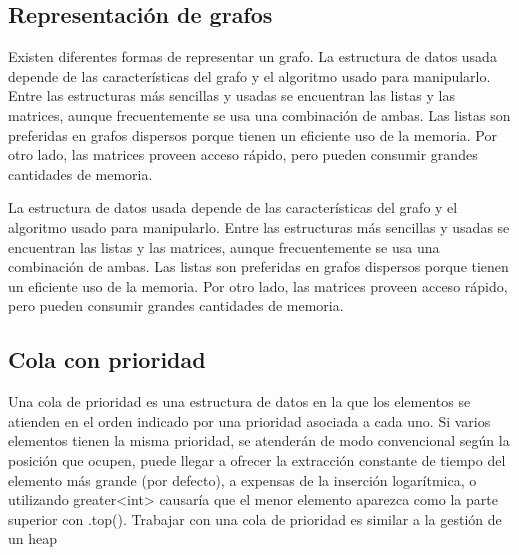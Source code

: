 \subsection{Representación de grafos}
Existen diferentes formas de representar un grafo. La estructura de datos usada depende de las características del grafo y el algoritmo usado para manipularlo. Entre las estructuras más sencillas y usadas se encuentran las listas y las matrices, aunque frecuentemente se usa una combinación de ambas. Las listas son preferidas en grafos dispersos porque tienen un eficiente uso de la memoria. Por otro lado, las matrices proveen acceso rápido, pero pueden consumir grandes cantidades de memoria.

La estructura de datos usada depende de las características del grafo y el algoritmo usado para manipularlo. Entre las estructuras más sencillas y usadas se encuentran las listas y las matrices, aunque frecuentemente se usa una combinación de ambas. Las listas son preferidas en grafos dispersos porque tienen un eficiente uso de la memoria. Por otro lado, las matrices proveen acceso rápido, pero pueden consumir grandes cantidades de memoria.

\subsection{Cola con prioridad}
Una cola de prioridad es una estructura de datos en la que los elementos se atienden en el orden
 indicado por una prioridad asociada a cada uno. Si varios elementos tienen la misma prioridad, se
atenderán de modo convencional según la posición que ocupen, puede llegar a ofrecer la extracción
constante de tiempo del elemento más grande (por defecto), a expensas de la inserción logarítmica, o
utilizando greater<int> causaría que el menor elemento aparezca como la parte superior con .top().
Trabajar con una cola de prioridad es similar a la gestión de un heap



